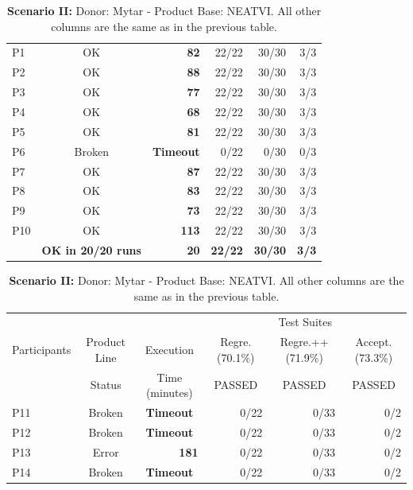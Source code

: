 \begin{table}[t]
\begin{tabular}{lcrrrr}
		 P1 &\multicolumn{1}{c}{OK}  &\textbf{82}  & 22/22 &30/30 &3/3 \\
		     P2 &OK      &\textbf{88}  & 22/22  &30/30  &3/3\\
		    P3 &OK     &\textbf{77}  & 22/22 &30/30   &3/3\\
		     P4 &OK      &\cellcolor[gray]{.9}\textbf{68}  & 22/22  &30/30 &3/3\\
		     P5 &OK      &\textbf{81}  & 22/22  &30/30  &3/3\\
		     P6 &Broken & \multicolumn{1}{c}{\textbf{Timeout}} & 0/22     &0/30     &0/3 \\
		     P7 &OK      &\textbf{87}  & 22/22 &30/30   &3/3  \\
		     P8 &OK     &\textbf{83}  & 22/22 &30/30   &3/3 \\
		     P9 &OK      &\textbf{73}  & 22/22 &30/30  &3/3\\
		     P10 &OK     &\textbf{113} & 22/22  &30/30  &3/3\\
		 \hline 
		 \rowcolor[gray]{.9} \textbf{\prodscalpel} &\textbf{OK in 20/20 runs} &\textbf{20} &\textbf{22/22}   &\textbf{30/30}   &\textbf{3/3} \\
		 \hline
	\end{tabular}
    \bigskip
    \bigskip
    \bigskip
    \caption{\textbf{Scenario II:} Donor: Mytar - Product Base: NEATVI. All other columns are the same as in the previous table.}\label{tab:B}
	\begin{tabular}{lcrrrr}\\\hline
	\multicolumn{1}{c}{}       & & & \multicolumn{3}{c}{Test Suites} \\                       
		\cline{4-6}  
		\multicolumn{1}{c}{Participants} & \multicolumn{1}{c}{ Product Line} & \multicolumn{1}{c}{Execution}& \multicolumn{1}{c}{Regre. (70.1\%)} & \multicolumn{1}{c}{Regre.++ (71.9\%)} & \multicolumn{1}{c}{Accept. (73.3\%)} \\
		\multicolumn{1}{c}{} & \multicolumn{1}{c}{Status} & \multicolumn{1}{c}{Time (minutes)} & \multicolumn{1}{c}{PASSED}  & \multicolumn{1}{c}{PASSED}  & \multicolumn{1}{c}{PASSED}  \\\hline
		 P11 &Broken & \multicolumn{1}{c}{\textbf{Timeout}} & 0/22 & 0/33 & 0/2\\
		 P12 &Broken  & \multicolumn{1}{c}{\textbf{Timeout}} & 0/22 & 0/33 & 0/2\\
		 P13 &Error    &\textbf{181} & 0/22 & 0/33 & 0/2\\
		 P14  &Broken &\multicolumn{1}{c}{\textbf{Timeout}} & 0/22 & 0/33 & 0/2\\

\end{tabular}
\end{table}
